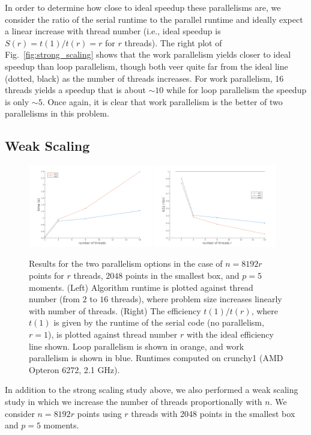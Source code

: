 \documentclass{article}
\begin{document}
In order to determine how close to ideal speedup these parallelisms are, we consider the ratio of the serial runtime to the parallel runtime and ideally expect a linear increase with thread number (i.e., ideal speedup is $S(r) = t(1)/t(r) = r$ for $r$ threads). The right plot of Fig.~\ref{fig:strong_scaling} shows that the work parallelism yields closer to ideal speedup than loop parallelism, though both veer quite far from the ideal line (dotted, black) as the number of threads increases. For work parallelism, 16 threads yields a speedup that is about $\sim 10$ while for loop parallelism the speedup is only $\sim 5$. Once again, it is clear that work parallelism is the better of two parallelisms in this problem.

\subsection{Weak Scaling}
\begin{figure}
  \centering
  \includegraphics[width=0.48\textwidth]{./figures/weak_scalability.png} %
  \includegraphics[width=0.48\textwidth]{./figures/weak_scalability2.png}
  \caption{Results for the two parallelism options in the case of $n=8192r$ points for $r$ threads, $2048$ points in the smallest box, and $p=5$ moments. (Left) Algorithm runtime is plotted against thread number (from $2$ to $16$ threads), where problem size increases linearly with number of threads. (Right) The efficiency $t(1)/t(r)$, where $t(1)$ is given by the runtime of the serial code (no parallelism, $r=1$), is plotted against thread number $r$ with the ideal efficiency line shown. Loop parallelism is shown in orange, and work parallelism is shown in blue. Runtimes computed on crunchy1 (AMD Opteron 6272, 2.1 GHz).}
  \label{fig:weak_scaling}
\end{figure}
In addition to the strong scaling study above, we also performed a weak scaling study in which we increase the number of threads proportionally with $n$. We consider $n=8192r$ points using $r$ threads with 2048 points in the smallest box and $p=5$ moments. 
\end{document}
